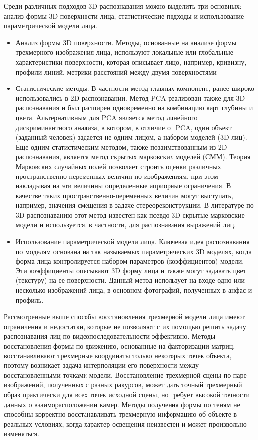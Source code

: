 \documentclass[12pt,a4paper]{article}					%
\begin{document}
Среди различных подходов 3D распознавания можно выделить три основных: анализ формы 3D поверхности лица, статистические подходы и использование параметрической модели лица.

\begin{itemize}
\item Анализ формы 3D поверхности. 
Методы, основанные на анализе формы трехмерного изображения лица, используют локальные или глобальные характеристики поверхности, которая описывает лицо, например, кривизну, профили линий, метрики расстояний между двумя поверхностями

\item Статистические методы. 
В частности метод главных компонент, ранее широко использовались в 2D распознавании. 
Метод PCA реализован также для 3D распознавания и был расширен одновременно на комбинацию карт глубины и цвета. Альтернативным для PCA является метод линейного дискриминантного анализа, в котором, в отличие от PCA, один объект (заданный человек) задается не одним лицом, а набором моделей (3D лиц).
Еще одним статистическим методом, также позаимствованным из 2D распознавания, является метод скрытых марковских моделей (СММ). 
Теория Марковских случайных полей позволяет строить оценки различных пространственно-переменных величин по изображениям, при этом накладывая на эти величины определенные априорные ограничения. 
В качестве таких пространственно-переменных величин могут выступать, например, значения смещения в задаче стереореконструкции. 
В литературе по 3D распознаванию этот метод известен как псевдо 3D скрытые марковские модели и используется, в частности, для распознавания выражений лиц. 
\item Использование параметрической модели лица. 
Ключевая идея распознавания по моделям основана на так называемых параметрических 3D моделях, когда форма лица контролируется набором параметров (коэффициентов) модели. 
Эти коэффициенты описывают 3D форму лица и также могут задавать цвет (текстуру) на ее поверхности. 
Данный метод использует на входе одно или несколько изображений лица, в основном фотографий, полученных в анфас и профиль. 
\end{itemize}

Рассмотренные выше способы восстановления трехмерной модели лица имеют ограничения и недостатки, которые не позволяют с их помощью решить задачу распознавания лиц по видеопоследовательности эффективно. 
Методы восстановления формы по движению, основанные на факторизации матриц, восстанавливают трехмерные координаты только некоторых точек объекта, поэтому возникает задача интерполяции его поверхности между восстановленными точками модели. 
Восстановление трехмерной сцены по паре изображений, полученных с разных ракурсов, может дать точный трехмерный образ практически для всех точек исходной сцены, но требует высокой точности данных о взаиморасположении камер. 
Методы получения формы по теням не способны корректно восстанавливать трехмерную информацию об объекте в реальных условиях, когда характер освещения неизвестен и может произвольно изменяться. 
\end{document}
